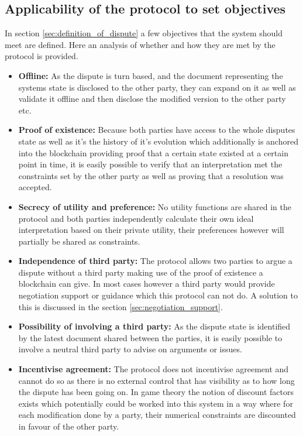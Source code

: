 \documentclass[12pt,msc,a4paper,oneside]{ucl_thesis}
\begin{document}
\subsection{Applicability of the protocol to set objectives}
In section \ref{sec:definition_of_dispute} a few objectives that the system should meet are defined. Here an analysis of whether and how they are met by the protocol is provided.
\begin{itemize}

    \item{\textbf{Offline:}} As the dispute is turn based, and the document representing the systems state is disclosed to the other party, they can expand on it as well as validate it offline and then disclose the modified version to the other party etc.

    \item{\textbf{Proof of existence:}} Because both parties have access to the whole disputes state as well as it's the history of it's evolution which additionally is anchored into the blockchain providing proof that a certain state existed at a certain point in time, it is easily possible to verify that an interpretation met the constraints set by the other party as well as proving that a resolution was accepted.

    \item{\textbf{Secrecy of utility and preference:}} No utility functions are shared in the protocol and both parties independently calculate their own ideal interpretation based on their private utility, their preferences however will partially be shared as constraints.

    \item{\textbf{Independence of third party:}} The protocol allows two parties to argue a dispute without a third party making use of the proof of existence a blockchain can give. In most cases however a third party would provide negotiation support or guidance which this protocol can not do. A solution to this is discussed in the section \ref{sec:negotiation_support}.

    \item{\textbf{Possibility of involving a third party:}} As the dispute state is identified by the latest document shared between the parties, it is easily possible to involve a neutral third party to advise on arguments or issues.

    \item{\textbf{Incentivise agreement:}} The protocol does not incentivise agreement and cannot do so as there is no external control that has visibility as to how long the dispute has been going on. In game theory the notion of discount factors exists which potentially could be worked into this system in a way where for each modification done by a party, their numerical constraints are discounted in favour of the other party. 


\end{itemize}
\end{document}
